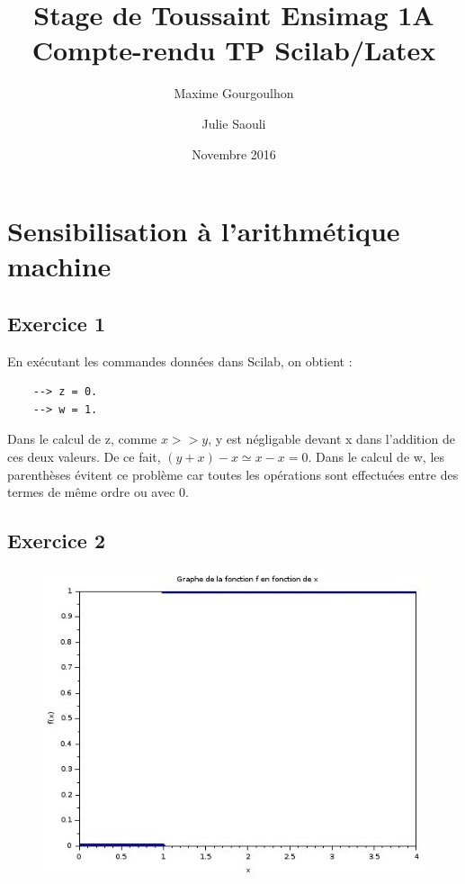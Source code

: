 \documentclass[a4paper,11pt]{article}
\title{Stage de Toussaint Ensimag 1A \\ Compte-rendu TP Scilab/Latex}
\author{Maxime Gourgoulhon \and Julie Saouli}
\date{Novembre 2016}
\begin{document}
\maketitle


\section{Sensibilisation à l'arithmétique machine}

\subsection*{Exercice 1}
	En exécutant les commandes données dans Scilab, on obtient :
	\begin{verbatim}
	--> z = 0.
	--> w = 1.
	\end{verbatim}
	
	Dans le calcul de z, comme $x >> y$, y est négligable devant x dans l'addition de ces deux valeurs. De ce fait, $(y+x)-x \simeq x - x = 0$.
	Dans le calcul de w, les parenthèses évitent ce problème car toutes les opérations sont effectuées entre des termes de même ordre ou avec 0.

	
\subsection*{Exercice 2}
\begin{figure}[!h]
	\begin{center}
		\includegraphics[scale=0.5]{graphes/exercice2.jpg}
	\end{center}	
\end{figure}
\end{document}
